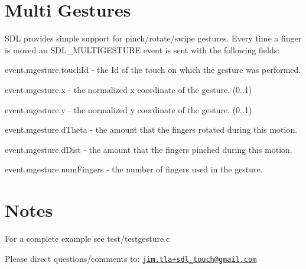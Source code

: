  \section*{Multi Gestures }

S\+DL provides simple support for pinch/rotate/swipe gestures. Every time a finger is moved an S\+D\+L\+\_\+\+M\+U\+L\+T\+I\+G\+E\+S\+T\+U\+RE event is sent with the following fields\+:


\begin{DoxyItemize}
\item event.\+mgesture.\+touch\+Id -\/ the Id of the touch on which the gesture was performed.
\item event.\+mgesture.\+x -\/ the normalized x coordinate of the gesture. (0..1)
\item event.\+mgesture.\+y -\/ the normalized y coordinate of the gesture. (0..1)
\item event.\+mgesture.\+d\+Theta -\/ the amount that the fingers rotated during this motion.
\item event.\+mgesture.\+d\+Dist -\/ the amount that the fingers pinched during this motion.
\item event.\+mgesture.\+num\+Fingers -\/ the number of fingers used in the gesture.
\end{DoxyItemize}



 \section*{Notes }

For a complete example see test/testgesture.\+c

Please direct questions/comments to\+: \href{mailto:jim.tla+sdl_touch@gmail.com}{\tt jim.\+tla+sdl\+\_\+touch@gmail.\+com} 